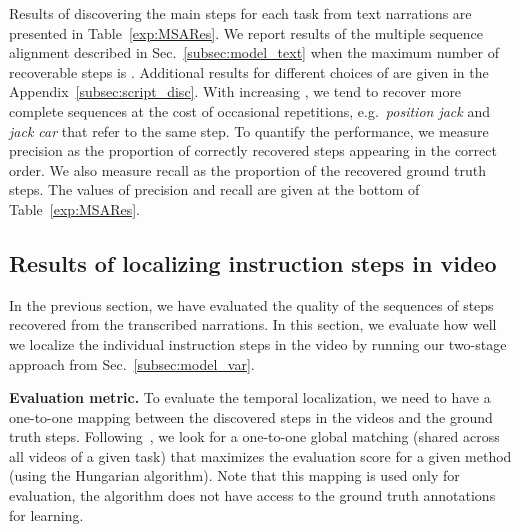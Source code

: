 \documentclass[10pt,twocolumn,letterpaper]{article}
\begin{document}
Results of discovering the main steps for each task from text narrations are presented in Table~\ref{exp:MSARes}.
We report results of the multiple sequence alignment described in Sec.~\ref{subsec:model_text} when the maximum number of recoverable steps is . Additional results for different choices of  are given in the Appendix~\ref{subsec:script_disc}. With increasing , we tend to recover more complete sequences at the cost of occasional repetitions, e.g.~{\em position jack} and {\em jack car} that refer to the same step. 
To quantify the performance, we measure precision as the proportion of correctly recovered steps appearing in the correct order. 
We also measure recall as the proportion of the recovered ground truth steps. 
The values of precision and recall are given at the bottom of Table~\ref{exp:MSARes}.



\subsection{Results of localizing instruction steps in video}
\label{sec:localization}


In the previous section, we have evaluated the quality of the sequences of steps recovered from the transcribed narrations. 
In this section, we evaluate how well we localize the individual instruction steps in the video by running our two-stage approach from Sec.~\ref{subsec:model_var}.


\textbf{Evaluation metric.}
To evaluate the temporal localization, we need to have a one-to-one mapping between the discovered steps in the videos and the ground truth steps.  Following~\cite{Liao05Clustering}, we look for a one-to-one global matching (shared across all videos of a given task) that maximizes the evaluation score for a given method (using the Hungarian algorithm).
Note that this mapping is used only for evaluation, the algorithm does not have access to the ground truth annotations for learning.
\end{document}
